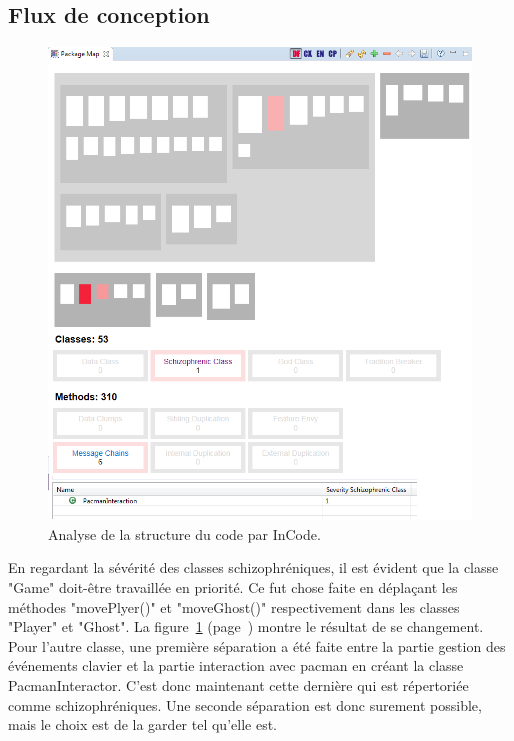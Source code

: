 \documentclass[12pt,a4paper,final]{article}
\newcommand{\labelfigure}[1]{figure~\ref{#1} (page~\pageref{#1})}
\begin{document}
\subsection{Flux de conception}\label{designflaws_refact}
\begin{figure}[!h]
	\centering
	\includegraphics[width=\textwidth]{InCodeDesignFlaws_refactor.png}
	\caption{\label{designflaws_refact}Analyse de la structure du code par InCode.}
\end{figure}
En regardant la sévérité des classes schizophréniques, il est évident que la classe "Game" doit-être travaillée en priorité. Ce fut chose faite en déplaçant les méthodes "movePlyer()" et "moveGhost()" respectivement dans les classes "Player" et "Ghost". La \labelfigure{designflaws_refact} montre le résultat de se changement.\\
Pour l'autre classe, une première séparation a été faite entre la partie gestion des événements clavier et la partie interaction avec pacman en créant la classe PacmanInteractor. C'est donc maintenant cette dernière qui est répertoriée comme schizophréniques. Une seconde séparation est donc surement possible, mais le choix est de la garder tel qu'elle est. 
\end{document}
